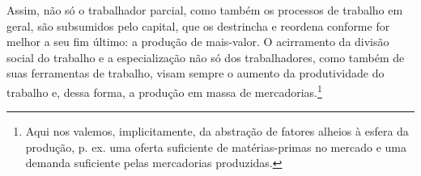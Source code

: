 Assim, não só o trabalhador parcial, como também os processos de trabalho em geral, são subsumidos pelo capital, que os destrincha e reordena conforme for melhor a seu fim último: a produção de mais-valor. O acirramento da divisão social do trabalho e a especialização não só dos trabalhadores, como também de suas ferramentas de trabalho, visam sempre o aumento da produtividade do trabalho e, dessa forma, a produção em massa de mercadorias.\footnote{Aqui nos valemos, implicitamente, da abstração de fatores alheios à esfera da produção, p. ex. uma oferta suficiente de matérias-primas no mercado e uma demanda suficiente pelas mercadorias produzidas.} %

